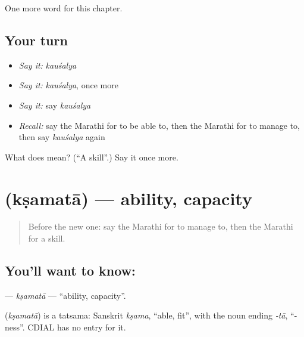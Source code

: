 \begin{grammarlens}[title={What you've built}]
One more word for this chapter.
\end{grammarlens}

\subsection*{Your turn}
\begin{itemize}
\raggedright
  \item \emph{Say it:} \emph{kauśalya}
  \item \emph{Say it:} \emph{kauśalya}, once more
  \item \emph{Say it:} say \emph{kauśalya}
  \item \emph{Recall:} say the Marathi for to be able to, then the Marathi for to manage to, then say \emph{kauśalya} again
\end{itemize}

\begin{tcolorbox}[breakable,colback=teal!4,colframe=teal!35!black,title={Before you move on}]
What does  mean? (\textquotedblleft{}A skill\textquotedblright{}.) Say it once more.
\end{tcolorbox}
\section[\texorpdfstring{\mr{क्षमता} (kṣamatā)}{क्षमता (kṣamatā)}]{ (kṣamatā) — ability, capacity}

\label{lesson:MR-C121-ksamata}



\begin{quote}
Before the new one: say the Marathi for to manage to, then the Marathi for a skill.
\end{quote}

\subsection*{You'll want to know: }
\textbf{} — \emph{kṣamatā} — \textquotedblleft{}ability, capacity\textquotedblright{}.

\begin{cousinweb}
\textbf{} (\emph{kṣamatā}) is a tatsama: Sanskrit \emph{kṣama}, \textquotedblleft{}able, fit\textquotedblright{}, with the noun ending \emph{-tā}, \textquotedblleft{}-ness\textquotedblright{}. CDIAL has no entry for it.
\end{cousinweb}

